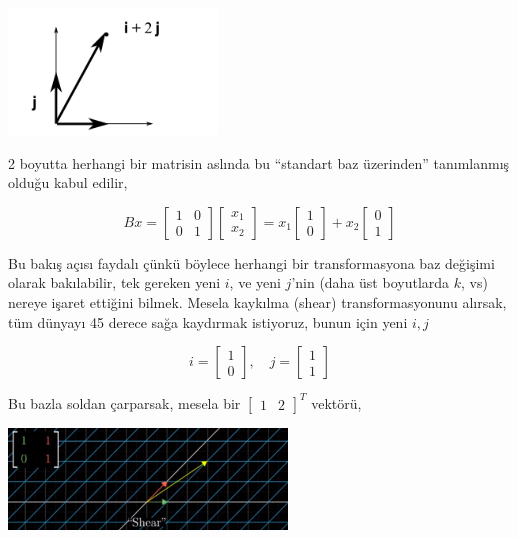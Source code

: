 \documentclass[12pt,fleqn]{article}\usepackage{../../common}
\begin{document}
\includegraphics[width=15em]{ijbasis.png}

2 boyutta herhangi bir matrisin aslında bu ``standart baz üzerinden''
tanımlanmış olduğu kabul edilir,

$$
Bx = 
\left[\begin{array}{ccc}
1 & 0 \\ 0 & 1
\end{array}\right]
\left[\begin{array}{c}
x_1 \\ x_2
\end{array}\right] =
x_1 \left[\begin{array}{c}
1 \\ 0
\end{array}\right] +
x_2 \left[\begin{array}{c}
0 \\ 1
\end{array}\right]
$$

Bu bakış açısı faydalı çünkü böylece herhangi bir transformasyona baz değişimi
olarak bakılabilir, tek gereken yeni $i$, ve yeni $j$'nin (daha üst boyutlarda
$k$, vs) nereye işaret ettiğini bilmek. Mesela kaykılma (shear)
transformasyonunu alırsak, tüm dünyayı 45 derece sağa kaydırmak istiyoruz, bunun
için yeni $i,j$

$$
i = \left[\begin{array}{c}1 \\ 0 \end{array}\right], \quad
j = \left[\begin{array}{c}1 \\ 1 \end{array}\right]
$$

Bu bazla soldan çarparsak, mesela bir $[\begin{array}{cc}1&2\end{array}]^T$ vektörü,

\includegraphics[width=20em]{shear.jpg}
\end{document}
